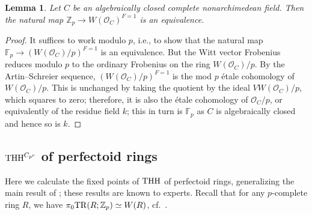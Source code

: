 \documentclass{amsart}
\newtheorem{lemma}[theorem]{Lemma}
\theoremstyle{definition}
\begin{document}
\begin{lemma} 
\label{Frobfixedex}
Let $C$ be an algebraically closed complete nonarchimedean field. 
Then the natural map $\mathbb{Z}_p \to W(\mathcal{O}_C)^{F=1}$ is an
equivalence. 
\end{lemma} 
\begin{proof} 
It suffices to work modulo $p$, i.e., to show that the natural map 
$\mathbb{F}_p \to (W(\mathcal{O}_C)/p)^{F = 1}$ is an equivalence. But the Witt
vector Frobenius reduces modulo $p$ to the ordinary Frobenius on the ring
$W(\mathcal{O}_C)/p$. By the Artin--Schreier  sequence, 
$(W(\mathcal{O}_C)/p)^{F = 1}$
is the mod $p$ \'etale cohomology of $W(\mathcal{O}_C)/p$. 
This is unchanged by taking the quotient by the ideal $V W(\mathcal{O}_C)/p$,
which squares to zero; therefore, it is also the \'etale cohomology of
$\mathcal{O}_C/p$, or equivalently of the residue field $k$; this in turn is
$\mathbb{F}_p$ as $C$ is algebraically closed and hence so is $k$. 
\end{proof} 











\subsection{$\mathrm{THH}^{C_{p^r}}$ of perfectoid rings}

Here we calculate the fixed points of $\mathrm{THH}$ of perfectoid rings, generalizing the
main result of \cite{Hes06}; these results are known to experts. 
Recall that for any $p$-complete ring $R$, we have $\pi_0 \mathrm{TR}(R; \mathbb{Z}_p)
\simeq W(R)$, cf.~\cite[Th.~F]{HM97}. 
\end{document}
